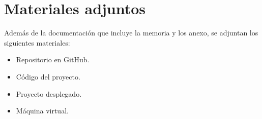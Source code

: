 \section{Materiales adjuntos}
Además de la documentación que incluye la memoria y los anexo, se adjuntan los siguientes materiales:
\begin{itemize}
    \item Repositorio en GitHub.
    \item Código del proyecto.
    \item Proyecto desplegado.  
    \item Máquina virtual. 
\end{itemize}